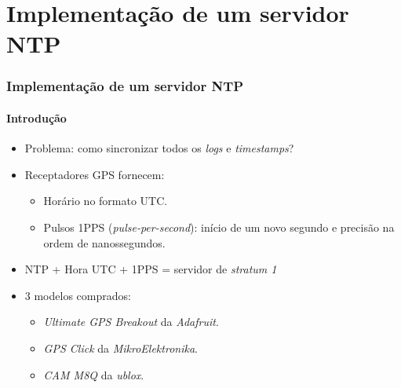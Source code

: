 \section {Implementação de um servidor NTP}


\begin{frame}
\frametitle{Implementação de um servidor NTP}
\framesubtitle{Introdução}

\begin{itemize}
  \item Problema: como sincronizar todos os \textit{logs} e
  \textit{timestamps}?
  \item Receptadores GPS fornecem:
  \begin{itemize}
    \item Horário no formato UTC.
    \item Pulsos 1PPS (\textit{pulse-per-second}): início de um novo
    segundo e precisão na ordem de nanossegundos.
  \end{itemize}
  \item NTP + Hora UTC + 1PPS = servidor de \textit{stratum 1}
  \vspace{8pt}
  \item 3 modelos comprados:
  \begin{itemize}
    \item \textit{Ultimate GPS Breakout} da \textit{Adafruit}.
    \item \textit{GPS Click} da \textit{MikroElektronika}. 
    \item \textit{CAM M8Q} da \textit{ublox}.
  \end{itemize} 
\end{itemize}

\end{frame}

% 
% 
% 

